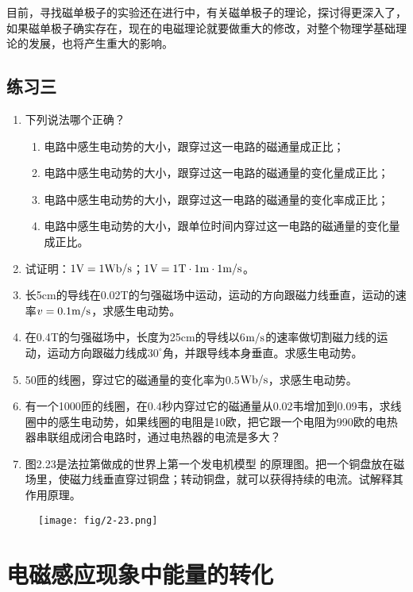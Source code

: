 目前，寻找磁单极子的实验还在进行中，有关磁单极子的理论，探讨得更深入了，如果磁单极子确实存在，现在的电磁理论就要做重大的修改，对整个物理学基础理论的发展，也将产生重大的影响。

\subsection*{练习三}

\begin{enumerate}
    \item 下列说法哪个正确？
    \begin{enumerate}
        \item 电路中感生电动势的大小，跟穿过这一电路的磁通量成正比；
        \item 电路中感生电动势的大小，跟穿过这一电路的磁通量的变化量成正比；
        \item 电路中感生电动势的大小，跟穿过这一电路的磁通量的变化率成正比；
        \item 电路中感生电动势的大小，跟单位时间内穿过这一电路的磁通量的变化量成正比。
    \end{enumerate}
\item 试证明：$1{\rm V}=1{\rm Wb}/{\rm s}$；$1{\rm V}=1{\rm T}\cdot 1{\rm m}\cdot 1\text{m}/\text{s}$。
\item  长5cm的导线在0.02T的匀强磁场中运动，运动的方向跟磁力线垂直，运动的速率$v=0.1\text{m}/\text{s}$，求感生电动势。
\item 在0.4T的匀强磁场中，长度为25cm的导线以6$\text{m}/\text{s}$的速率做切割磁力线的运动，运动方向跟磁力线成$30^{\circ}$角，并跟导线本身垂直。求感生电动势。
\item 50匝的线圈，穿过它的磁通量的变化率为0.5${\rm Wb}/{\rm s}$，求感生电动势。
\item 有一个1000匝的线圈，在0.4秒内穿过它的磁通量从0.02韦增加到0.09韦，求线圈中的感生电动势，如果线圈的电阻是10欧，把它跟一个电阻为990欧的电热器串联组成闭合电路时，通过电热器的电流是多大？
\item 图2.23是法拉第做成的世界上第一个发电机模型
的原理图。把一个铜盘放在磁场里，使磁力线垂直穿过铜盘；转动铜盘，就可以获得持续的电流。试解释其作用原理。
\end{enumerate}

\begin{figure}[htp]\centering
\texttt{[image: fig/2-23.png]}
\caption{}
\end{figure}

\section{电磁感应现象中能量的转化}

